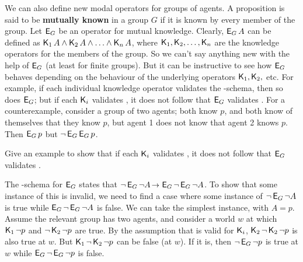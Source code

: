 We can also define new modal operators for groups of agents. A proposition is
said to be \textbf{mutually known} in a group $G$ if it is known by every member
of the group. Let $\operatorname{\mathsf{E}}_G$ be an operator for mutual knowledge. Clearly,
$\operatorname{\mathsf{E}}_G A$ can be defined as $\operatorname{\mathsf{K}{}}_1 A \land \operatorname{\mathsf{K}{}}_2 A \land \ldots \land \operatorname{\mathsf{K}{}}_n A$,
where $\operatorname{\mathsf{K}{}}_1, \operatorname{\mathsf{K}{}}_2, \ldots, \operatorname{\mathsf{K}{}}_n$ are the knowledge operators for the members
of the group. So we can't say anything new with the help of $\operatorname{\mathsf{E}}_G$ (at least
for finite groups). But it can be instructive to see how $\operatorname{\mathsf{E}}_G$ behaves
depending on the behaviour of the underlying operators $\operatorname{\mathsf{K}{}}_1,\operatorname{\mathsf{K}{}}_2,$ etc. For
example, if each individual knowledge operator validates the -schema, then
so does $\operatorname{\mathsf{E}}_G$; but if each $\operatorname{\mathsf{K}{}}_i$ validates ,
it does not follow that $\operatorname{\mathsf{E}}_G$ validates . For a counterexample, consider
a group of two agents; both know $p$, and both know of themselves that they know
$p$, but agent 1 does not know that agent 2 knows $p$. Then $\operatorname{\mathsf{E}}_G p$ but
$\neg \operatorname{\mathsf{E}}_G \operatorname{\mathsf{E}}_G p$.

\begin{exercise}
  Give an example to show that if each $\operatorname{\mathsf{K}{}}_i$ validates ,
  it does not follow that $\operatorname{\mathsf{E}}_G$ validates .
\end{exercise}
\begin{solution}
  The -schema for $\operatorname{\mathsf{E}}_G$ states that
  $\neg \EKn_G \neg A \to \EKn_G \neg \EKn_G \neg A$. To show that some instance
  of this is invalid, we need to find a case where some instance of
  $\neg \operatorname{\mathsf{E}}_G \neg A$ is true while $\operatorname{\mathsf{E}}_G \neg \operatorname{\mathsf{E}}_G \neg A$ is false. We
  can take the simplest instance, with $A=p$. Assume the relevant group has two
  agents, and consider a world $w$ at which $\operatorname{\mathsf{K}{}}_1 \neg p$ and
  $\neg \operatorname{\mathsf{K}{}}_2 \neg p$ are true. By the assumption that  is valid for
  $\operatorname{\mathsf{K}{}}_i$, $\operatorname{\mathsf{K}{}}_2\neg\operatorname{\mathsf{K}{}}_2\neg p$ is also true at $w$. But
  $\operatorname{\mathsf{K}{}}_1\neg \operatorname{\mathsf{K}{}}_2\neg p$ can be false (at $w$). If it is, then
  $\neg \operatorname{\mathsf{E}}_G \neg p$ is true at $w$ while $\operatorname{\mathsf{E}}_G \neg \operatorname{\mathsf{E}}_G \neg p$ is
  false.
\end{solution}


